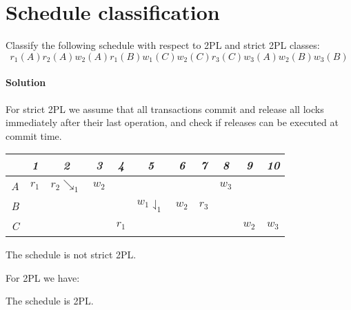 \section{Schedule classification}

Classify the following schedule with respect to 2PL and strict 2PL classes: 
\[r_1(A) r_2(A) w_2(A) r_1(B) w_1(C) w_2(C) r_3(C) w_3(A) w_2(B) w_3(B)\]

\paragraph*{Solution}
For strict 2PL we assume that all transactions commit and release all locks immediately after their last operation, and check if releases can be executed at commit time.
\begin{table}[H]
    \centering
    \begin{tabular}{c|cccccccccc}
            & \textit{1} & \textit{2} & \textit{3} & \textit{4} & \textit{5} & \textit{6} & \textit{7} & \textit{8} & \textit{9} & \textit{10} \\ \hline
    \textit{A} & $r_1$      & $r_2\searrow _1$          & $w_2$      &            &            &            &            & $w_3$      &            &             \\
    \textit{B} &            &                           &            &            & $w_1\downharpoonleft_1$      & $w_2$      & $r_3$      &            &            &             \\
    \textit{C} &            &                           &            & $r_1$      &            &            &            &            & $w_2$      & $w_3$      
    \end{tabular}%
\end{table}
The schedule is not strict 2PL.

For 2PL we have:
\begin{table}[H]
    \centering
\end{table}
The schedule is 2PL. 